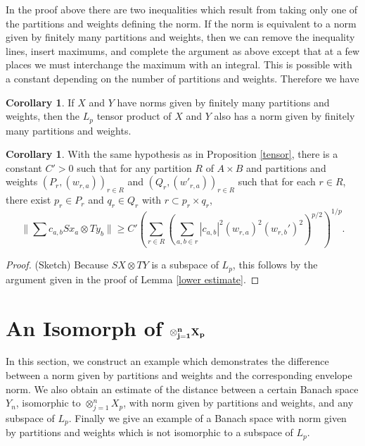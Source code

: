 \documentclass[12pt]{amsart}
\theoremstyle{definition}
\newtheorem{corollary}[theorem]{Corollary}
\theoremstyle{remark}
\numberwithin{equation}{section}
\begin{document}
In the proof above there are two inequalities which result from taking only
one of the partitions and weights defining the norm. If the norm is
equivalent to a norm given by finitely many partitions and weights, then we
can remove the inequality lines, insert maximums,
and complete the argument as above except that at a few places we must 
interchange the maximum with an integral. This is possible with a constant
depending on the number of partitions and weights. Therefore we have

\begin{corollary} If $X$ and $Y$ have norms given by finitely many
partitions and weights, then the $L_p$ tensor product of $X$ and $Y$ also
has a norm given by finitely many partitions and weights.
\end{corollary}

\begin{corollary} With the same hypothesis as in Proposition \ref{tensor},
 there is a constant $C'>0$ such that
for any partition $R$ of $A\times B$ and partitions and weights
$(P_r,(w_{r,a}))_{r\in R}$ and $(Q_r,(w'_{r,a}))_{r\in R}$ such that
for each $r \in R$, there exist $p_r\in P_r$ and $q_r \in Q_r$ with $r
\subset p_r \times q_r$,
$$ \|\sum c_{a,b} Sx_a \otimes Ty_b\| \ge C' \left(\sum_{r\in R}
\left( \sum_{a,b \in r} |c_{a,b}|^2 (w_{r,a})^2 (w_{r,b}')^2\right
)^{p/2}\right
)^{1/p}.$$
\end{corollary}

\begin{proof} (Sketch)
Because $SX \otimes TY$ is a subspace of $L_p$, this follows by the argument
given in the proof of Lemma
\ref{lower estimate}.
\end{proof}
\section{An Isomorph of $\bf{\otimes_{j=1}^n X_{p}}$}
\label{Distance}
In this section, we construct an example which demonstrates the
difference between a norm given by partitions and weights and the
 corresponding envelope norm. We also obtain an estimate of the distance
between a certain Banach space $Y_n$, isomorphic to $\otimes_{j=1}^n
X_{p} $, with norm given by partitions and weights,
 and any subspace of $L_p$. 
Finally we give an example of a Banach space with norm given by
partitions and weights which is 
not isomorphic to a subspace of $L_p$.\\
\end{document}
